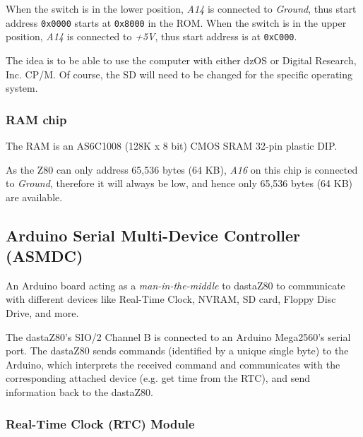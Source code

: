 \documentclass[a4paper,11pt]{article}
\begin{document}
    When the switch is in the lower position, \textit{A14} is connected to 
    \textit{Ground}, thus start address \texttt{0x0000} starts at 
    \texttt{0x8000} in the ROM. When the switch is in the upper position, 
    \textit{A14} is connected to \textit{+5V}, thus start address is at 
    \texttt{0xC000}.

    The idea is to be able to use the computer with either dzOS or Digital 
    Research, Inc. CP/M. Of course, the SD will need to be changed for the
    specific operating system.

    \subsubsection{RAM chip}

    The RAM is an AS6C1008 (128K x 8 bit) CMOS SRAM 32-pin plastic DIP.

    As the Z80 can only address 65,536 bytes (64 KB), \textit{A16} on this chip
    is connected to \textit{Ground}, therefore it will always be low, and hence
    only 65,536 bytes (64 KB) are available.

    \subsection{ Arduino Serial Multi-Device Controller (ASMDC)}

    An Arduino board acting as a \textit{man-in-the-middle} to dastaZ80 to
    communicate with different devices like Real-Time Clock, NVRAM, SD card,
    Floppy Disc Drive, and more.

    The dastaZ80's SIO/2 Channel B is connected to an Arduino Mega2560's serial
    port. The dastaZ80 sends commands (identified by a unique single byte) to
    the Arduino, which interprets the received command and communicates with the
    corresponding attached device (e.g. get time from the RTC), and send
    information back to the dastaZ80.

    \subsubsection{Real-Time Clock (RTC) Module}
\end{document}
